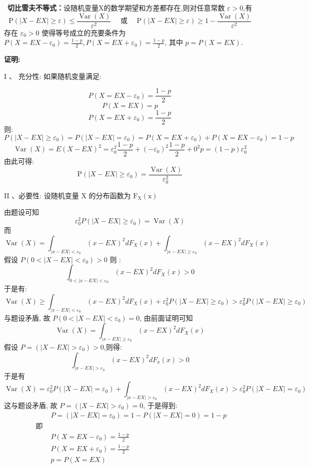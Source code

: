 \documentclass[10pt,a4paper]{article}
\begin{document}
\
\textbf{切比雪夫不等式：}设随机变量X的数学期望和方差都存在,则对任意常数 $\varepsilon>0$,有
$$
\mathrm{P}(|X-E X| \geq \varepsilon) \leq \frac{\operatorname{Var}(X)}{\varepsilon^{2}} \quad \text { 或 } \quad \mathrm{P}(|X-E X| \geq \varepsilon) \geq 1-\frac{\operatorname{Var}(X)}{\varepsilon^{2}}
$$
存在 $\varepsilon_{0}>0$ 使得等号成立的充要条件为 $P\left(X=E X-\varepsilon_{0}\right)=\frac{1-p}{2}, P\left(X=E X+\varepsilon_{0}\right)=\frac{1-p}{2}$, 其中 $p=P(X=E X)$.


\textbf{证明:}


$\mathrm{I}$ 、 充分性: 如果随机变量满足:

\begin{flushleft}
$$P\left(X=E X-\varepsilon_{0}\right)=\frac{1-p}{2}$$
$$P(X=E X)=p$$
$$P\left(X=E X+\varepsilon_{0}\right)=\frac{1-p}{2}$$ 则:
$$
P\left(|X-E X| \geq \varepsilon_{0}\right)=P\left(|X-E X|=\varepsilon_{0}\right)=P\left(X=E X+\varepsilon_{0}\right)+P\left(X=E X-\varepsilon_{0}\right)=1-p
$$
$$\operatorname{Var}(X)=E(X-E X)^{2}=\varepsilon_{0}^{2} \frac{1-p}{2}+\left(-\varepsilon_{0}\right)^{2} \frac{1-p}{2}+0^{2} p=(1-p) \varepsilon_{0}^{2}$$
 由此可得:
$$
\mathrm{P}\left(|X-E X| \geq \varepsilon_{0}\right)=\frac{\operatorname{Var}(X)}{\varepsilon_{0}^{2}}
$$
\end{flushleft}
II 、必要性: 设随机变量 $\mathrm{X}$ 的分布函数为 $\mathrm{F}_{\mathrm{X}}(\mathrm{x})$

由题设可知 
$$\varepsilon_{0}^{2} P\left(|X-E X| \geq \varepsilon_{0}\right)=\operatorname{Var}(X)$$
而
$$\operatorname{Var}(X) = \int_{|x-E X |< \varepsilon_{0}}(x-E X)^{2} d F_{X}(x)+\int_{|x-E X |\geq \varepsilon_{0}}(x-E X)^{2} d F_{X}(x)$$
假设 $P\left(0<| X-E X | <\varepsilon_{0}\right)>0$ 则 :
$$\int_{0<| x-E X|<\varepsilon_{0}}(x-E X)^{2} d F_{X}(x)>0$$ 
于是有:
$$\operatorname{Var}(X) \geq \int_{| x-E X |< \varepsilon_{0}}(x-E X)^{2} d F_{X}(x)+\varepsilon_{0}^{2} P\left(|X-E X |\geq \varepsilon_{0}\right)>\varepsilon_{0}^{2} P\left(|X-E X| \geq \varepsilon_{0}\right)$$
 与题设矛盾, 故 $P\left(0<|X-E X |< \varepsilon_{0}\right)=0$, 由前面证明可知
$$
\operatorname{Var}(X)=\int_{|x-E X| \geq \varepsilon_{0}}(x-E X)^{2} d F_{X}(x)
$$
假设 $P=\left(|X-E X|>\varepsilon_{0}\right)>0$,则得:$$\int_{|x-E X| > \varepsilon_{0}}(x-E X)^{2} d F_{x}(x)>0$$
于是有 
$$
\operatorname{Var}(X)=\varepsilon_{0}^{2} P\left(|X-E X|=\varepsilon_{0}\right)+\int_{|x-E X|>\varepsilon_0}(x-E X)^{2} d F_{X}(x)>\varepsilon_{0}^{2} P\left(|X-E X|=\varepsilon_{0}\right)
$$
这与题设矛盾, 故 $P=\left(|X-E X|>\varepsilon_{0}\right)=0$, 于是得到:
$$
\begin{aligned}
&P=\left(|X-E X|=\varepsilon_{0}\right)=1-P(|X-E X|=0)=1-p \\ \text { 即 } \\
&P\left(X=E X-\varepsilon_{0}\right)=\frac{1-p}{2}\\
&P\left(X=E X+\varepsilon_{0}\right)=\frac{1-p}{2}\\
&p=P(X=E X)
\end{aligned}
$$
\end{document}
